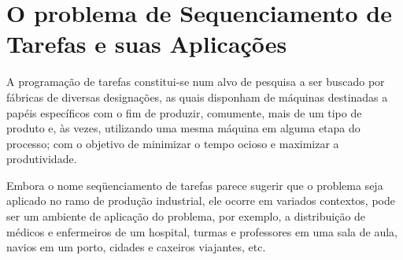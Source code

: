 \section{O problema de Sequenciamento de Tarefas e suas Aplicações}
A programação de tarefas constitui-se num alvo de pesquisa a ser buscado por fábricas de diversas designações, as quais disponham de máquinas destinadas a papéis específicos com o fim de produzir, comumente, mais de um tipo de produto e, às vezes, utilizando uma mesma máquina em alguma etapa do processo; com o objetivo de minimizar o tempo ocioso e maximizar a produtividade.

Embora o nome seqüenciamento de tarefas parece sugerir que o problema seja aplicado no ramo de produção industrial, ele ocorre em variados contextos, pode ser um ambiente de aplicação do problema, por exemplo, a distribuição de médicos e enfermeiros de um hospital, turmas e professores em uma sala de aula, navios em um porto, cidades e caxeiros viajantes, etc. \cite{REIS} 



